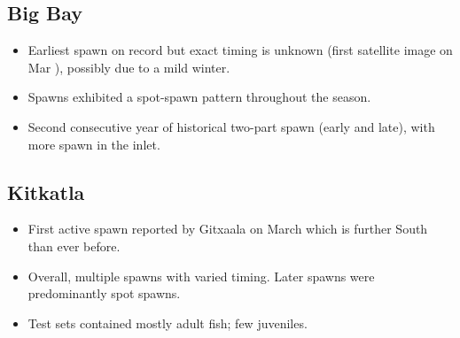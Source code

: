 \subsection{Big Bay}

\begin{itemize}

\item Earliest spawn on record but exact timing is unknown
(first satellite image on Mar ),
possibly due to a mild winter.

\item Spawns exhibited a spot-spawn pattern throughout the season.

\item Second consecutive year of historical two-part spawn (early and late),
with more spawn in the inlet.

\end{itemize}

\subsection{Kitkatla}

\begin{itemize}

\item First active spawn reported by Gitxaala on March  which is
further South than ever before.

\item Overall, multiple spawns with varied timing.
Later spawns were predominantly spot spawns.

\item Test sets contained mostly adult fish; few juveniles.

\end{itemize}